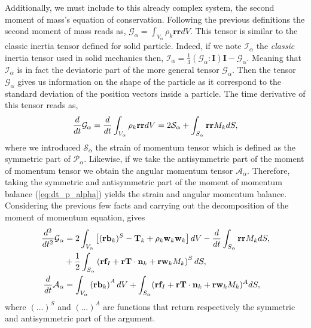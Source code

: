 Additionally, we must include to this already complex system, the second moment of mass's equation of conservation. 
Following the previous definitions the second moment of mass reads as, $\mathcal{G}_\alpha = \int_{V_\alpha} \rho_k \textbf{rr}dV$.
This tensor is similar to the classic inertia tensor defined for solid particle.  
Indeed, if we note $\mathcal{I}_\alpha$ the \textit{classic} inertia tensor used in solid mechanics then, $\mathcal{I}_\alpha = \frac{1}{3}(\mathcal{G}_\alpha : \textbf{I})\mathbf{I} - \mathcal{G}_\alpha$. 
Meaning that $\mathcal{I}_\alpha$ is in fact the deviatoric part of the more general tensor $\mathcal{G}_\alpha$. 
Then the tensor $\mathcal{G}_\alpha$ gives  us information on the shape of the particle as it correspond to the standard deviation of the position vectors inside a particle. 
The time derivative of this tensor reads as,  
\begin{equation}
    \frac{d}{d t} \mathcal{G}_\alpha
    = \frac{d}{d t} \int_{V_\alpha} \rho_k \textbf{rr} dV 
    = 2 \mathcal{S}_\alpha
    + \int_{S_\alpha} \textbf{rr} M_k dS,
    \label{eq:G_alpha_dt}
\end{equation}
where we introduced $\mathcal{S}_\alpha$ the strain of momentum tensor which is defined as the symmetric part of $\mathcal{P}_\alpha$.
Likewise, if we take the antisymmetric part of the moment of momentum tensor we obtain the angular momentum tensor $\mathcal{A}_\alpha$. 
Therefore, taking the symmetric and antisymmetric part of the moment of momentum balance (\ref{eq:dt_p_alpha}) yields the strain and angular momentum balance. 
Considering the previous few facts and carrying out the decomposition of the moment of momentum equation,  gives
\begin{align}
    \label{eq:dt2_G_alpha_dt}
    \frac{d^2}{dt^2} \mathcal{G}_\alpha
    &=2 \int_{V_\alpha}\left[
        (\textbf{r} \textbf{b}_k)^S 
        - \textbf{T}_k
        + \rho_k \textbf{w}_k  \textbf{w}_k 
    \right] dV  
    - \frac{d}{d t} \int_{S_\alpha} \textbf{rr} M_k dS, \nonumber \\
    &+ \frac{1}{2}\int_{S_\alpha} \left(
            \textbf{r}\textbf{f}_I
            + \textbf{r}\textbf{T} \cdot \textbf{n}_k
            + \textbf{r}\textbf{w}_k M_k
    \right)^SdS, \\
    \label{eq:dt_2A_alpha}
    \frac{d}{d t} \mathcal{A}_\alpha
    &= \int_{V_\alpha} \left( 
        \textbf{r} \textbf{b}_k 
    \right)^A dV
    + \int_{S_\alpha} 
            (\textbf{r}\textbf{f}_I
            + \textbf{r}\textbf{T} \cdot \textbf{n}_k
            + \textbf{r}\textbf{w}_k M_k)^A 
    dS,
\end{align}
where $(\ldots)^S$ and $(\ldots)^A$ are functions that return respectively the symmetric and antisymmetric part of the argument.  


